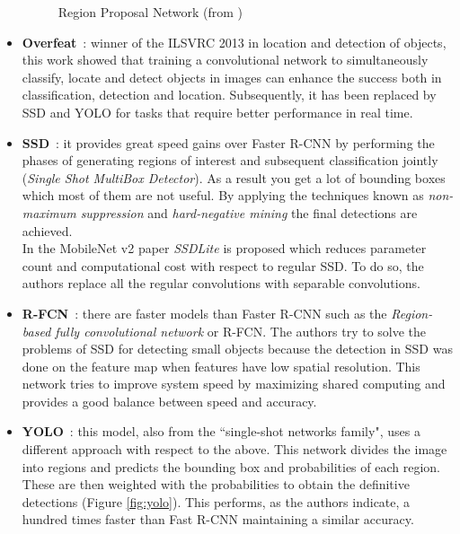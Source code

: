 \begin{itemize}
\begin{figure}[H]
\begin{center}
    \caption{Region Proposal Network (from \cite{ren2015faster})}
    \label{fig:fasterrcnn}
    \end{center}
    \end{figure}
\item \textbf{Overfeat}~\cite{sermanet2013overfeat}: winner of the ILSVRC 2013 in location and detection of objects, this work showed that training a convolutional network to simultaneously classify, locate and detect objects in images can enhance the success both in classification, detection and location. Subsequently, it has been replaced by SSD and YOLO for tasks that require better performance in real time.
\item \textbf{SSD}~\cite{liu2016ssd}: it provides great speed gains over Faster R-CNN by performing the phases of generating regions of interest and subsequent classification jointly (\textit{Single Shot MultiBox Detector}). As a result you get a lot of bounding boxes which most of them are not useful. By applying the techniques known as \textit{non-maximum suppression} and \textit{hard-negative mining} the final detections are achieved.\\
In the MobileNet v2 paper \cite{sandler2018mobilenetv2} \textit{SSDLite} is proposed which reduces parameter count and computational cost with respect to regular SSD. To do so, the authors replace all the regular convolutions with separable convolutions.
\item \textbf{R-FCN}~\cite{dai2016r}: there are faster models than Faster R-CNN such as the \textit{Region-based fully convolutional network} or R-FCN. The authors try to solve the problems of SSD for detecting small objects because the detection in SSD was done on the feature map when features have low spatial resolution. This network tries to improve system speed by maximizing shared computing and provides a good balance between speed and accuracy.
\item \textbf{YOLO}~\cite{redmon2016you}: this model, also from the ``single-shot networks family", uses a different approach with respect to the above. This network divides the image into regions and predicts the bounding box and probabilities of each region. These are then weighted with the probabilities to obtain the definitive detections (Figure \ref{fig:yolo}). This performs, as the authors indicate, a hundred times faster than Fast R-CNN maintaining a similar accuracy.\\
\begin{figure}[H]
\begin{center}

\end{center}
\end{figure}
\end{itemize}
